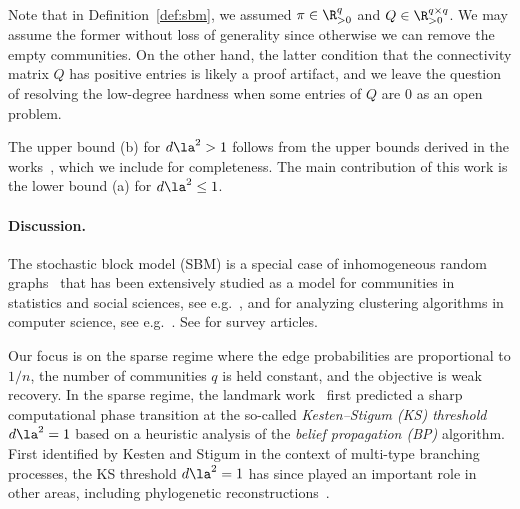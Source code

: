 \documentclass[11pt]{article}
\begin{document}
Note that in Definition~\ref{def:sbm}, we assumed $\pi\in \R_{> 0}^{q}$ and $Q\in \R_{>0}^{q\times q}$. We may assume the former without loss of generality since otherwise we can remove the empty communities. On the other hand, the latter condition that the connectivity matrix $Q$ has positive entries is likely a proof artifact, and we leave the question of resolving the low-degree hardness when some entries of $Q$ are $0$ as an open problem.

The upper bound (b) for $d\la^2>1$ follows from the upper bounds derived in the works~\cite{AS-acyclic,HS-bayesian}, which we include for completeness. The main contribution of this work is the lower bound (a) for $d\la^2\leq 1$.

\paragraph{Discussion.}
The stochastic block model (SBM) is a special case of 
inhomogeneous random graphs~\cite{BoJaRi:07} that has been extensively studied as a model for communities in statistics and social sciences, see e.g.~\cite{HoLaLe:83, SnijdersNowicki:97, BC:09, RCY:11}, and for analyzing clustering algorithms in computer science, see e.g.~\cite{DyerFrieze:89,JerrumSorkin:98,CondonKarp:01,McSherry:01,CojaOghlan:10}. See \cite{moore-survey-sbm,abbe-survey-sbm} for survey articles. 

Our focus is on the sparse regime where the edge probabilities are proportional to $1/n$, the number of communities $q$ is held constant, and the objective is weak recovery. In the sparse regime, the landmark work~\cite{decelle} first predicted a sharp computational phase transition at the so-called \emph{Kesten--Stigum (KS) threshold} $d\la^2=1$ based on a heuristic analysis of the \emph{belief propagation (BP)} algorithm. First identified by Kesten and Stigum \cite{KestenStigum:66} in the context of multi-type branching processes, the KS threshold $d\la^2=1$ has since played an important role in other areas, including phylogenetic reconstructions~\cite{DaMoRo:11,MoRoSl:11,RochSly:17}.
\end{document}
